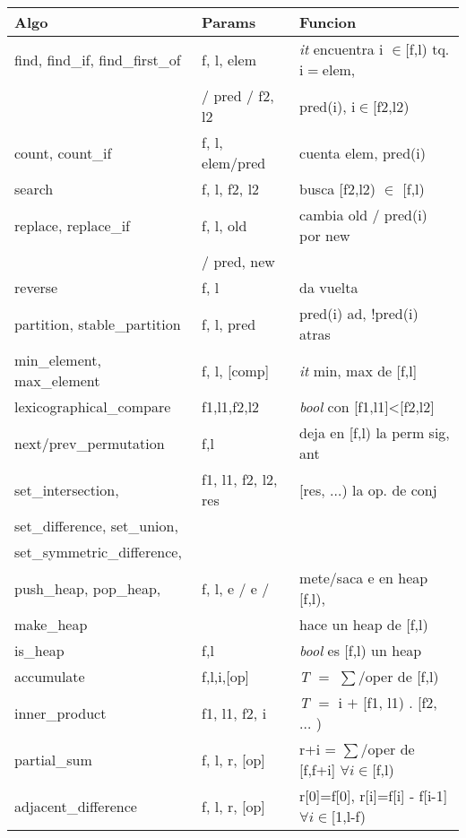 \documentclass[10pt,landscape,twocolumn,a4paper,notitlepage]{article}
\begin{document}
\begin{tabular}{|l|l|l|} \hline
\textbf{Algo} & \textbf{Params} &  \textbf{Funcion} \\  \hline

find, find\_if, find\_first\_of & f, l, elem & \textit{it} encuentra i $\in$[f,l) tq. i$=$elem, \\ & / pred / f2, l2 & pred(i), i$\in$[f2,l2) \\ \hline
count, count\_if & f, l, elem/pred & cuenta elem, pred(i) \\ \hline
search & f, l, f2, l2 & busca [f2,l2) $\in$ [f,l) \\ \hline
replace, replace\_if & f, l, old & cambia old / pred(i) por new \\ & / pred, new & \\ \hline
reverse & f, l & da vuelta \\ \hline
partition, stable\_partition & f, l, pred & pred(i) ad, !pred(i) atras \\ \hline
min\_element, max\_element & f, l, [comp] & \textit{it} min, max de [f,l] \\ \hline
lexicographical\_compare & f1,l1,f2,l2 & \textit{bool} con [f1,l1]<[f2,l2] \\ \hline
next/prev\_permutation & f,l & deja en [f,l) la perm sig, ant \\ \hline
set\_intersection, & f1, l1, f2, l2, res & [res, $\ldots$) la op. de conj\\
set\_difference, set\_union, & & \\
set\_symmetric\_difference, & & \\ \hline
push\_heap, pop\_heap, & f, l, e / e / & mete/saca e en heap [f,l), \\
make\_heap & & hace un heap de [f,l) \\ \hline
is\_heap & f,l & \textit{bool} es [f,l) un heap \\ \hline
accumulate & f,l,i,[op] & \textit{T} $=$ $\sum$/oper de [f,l) \\ \hline
inner\_product & f1, l1, f2, i & \textit{T} $=$ i $+$ [f1, l1) . [f2, $\ldots$ ) \\ \hline
partial\_sum & f, l, r, [op] & r+i = $\sum$/oper de [f,f+i] $\forall i \in$[f,l) \\ \hline
adjacent\_difference & f, l, r, [op] & r[0]=f[0], r[i]=f[i] - f[i-1] $\forall i \in$[1,l-f) \\ \hline
\end{tabular}
\end{document}
